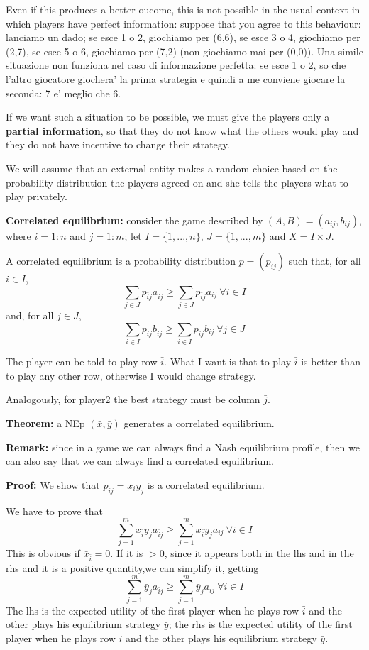 \noindent Even if this produces a better oucome, this is not possible in 
the usual context in which players have perfect information: suppose that you 
agree to this behaviour: lanciamo un dado; se esce 1 o 2, giochiamo per (6,6), 
se esce 3 o 4, giochiamo per (2,7), se esce 5 o 6, giochiamo per (7,2) (non 
giochiamo mai per (0,0)). Una simile situazione non funziona nel caso di 
informazione perfetta: se esce 1 o 2, so che l'altro giocatore giochera' la 
prima strategia e quindi a me conviene giocare la seconda: 7 e' meglio che 6.

\bigskip
\noindent If we want such a situation to be possible, we must give the players only a \textbf{partial information}, so that they do not know what the others would play and they do not have incentive to change their strategy.

\noindent We will assume that an external entity makes a random choice based on the probability distribution the players agreed on and she tells the players what to play privately. 

\bigskip
\noindent \textbf{Correlated equilibrium:} consider the game described by $(A,B) = (a_{ij}, b_{ij})$, where $i=1:n$ and $j=1:m$; let $I = \{1,...,n\}$, $J = \{1,...,m\}$ and $X = I \times J$.

\noindent A correlated equilibrium is a probability distribution $p = (p_{ij})$ such that, for all $\bar{i} \in I$,
\[
	\sum_{j \in J}p_{\bar{i}j}a_{\bar{i}j} \geq \sum_{j \in J}p_{\bar{i}j}a_{ij} ~\forall i \in I
\]
and, for all $\bar{j} \in J$,
\[
\sum_{i \in I}p_{i\bar{j}}b_{i\bar{j}} \geq \sum_{i \in I}p_{i\bar{j}}b_{ij} ~\forall j \in J
\]

\bigskip
\noindent The player can be told to play row $\bar{i}$. What I want is that 
to play $\bar{i}$ is better than to play any other row, otherwise I would 
change strategy.

\noindent Analogously, for player2 the best strategy must be column $\bar{j}$.

\bigskip
\noindent \textbf{Theorem:} a NEp $(\bar{x},\bar{y})$ generates a correlated equilibrium.

\bigskip
\noindent \textbf{Remark:} since in a game we can always find a Nash equilibrium 
profile, then we can also say that we can always find a correlated equilibrium. 

\bigskip
\noindent \textbf{Proof:} We show that $p_{ij} = \bar{x}_i\bar{y}_j$ is a correlated equilibrium.

\noindent We have to prove that
\[
	\sum_{j=1}^m{\bar{x}_{\bar{i}}\bar{y}_ja_{\bar{i}j}} \geq 
	\sum_{j=1}^m{\bar{x}_{\bar{i}}\bar{y}_ja_{ij}} ~\forall i \in I
\]
This is obvious if $\bar{x}_{\bar{i}} = 0$. If it is $> 0$, since it appears both in the lhs and in the rhs and it is a positive quantity,we can simplify it, getting
\[
\sum_{j=1}^m{\bar{y}_ja_{\bar{i}j}} \geq 
\sum_{j=1}^m{\bar{y}_ja_{ij}} ~\forall i \in I
\]
The lhs is the expected utility of the first player when he plays row $\bar{i}$ and the other plays his equilibrium strategy $\bar{y}$; the rhs is the expected utility of the first player when he plays row $i$ and the other plays his equilibrium strategy $\bar{y}$.

